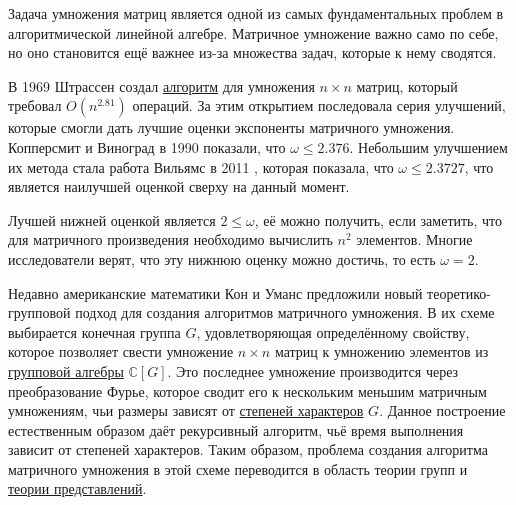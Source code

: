 Задача умножения матриц является одной из самых фундаментальных проблем в алгоритмической линейной алгебре. Матричное умножение важно само по себе, но оно становится ещё важнее из-за множества задач, которые к нему сводятся.
 
В 1969 Штрассен \cite{Strassen:1969} создал \hyperref[Strassen_algorithm]{алгоритм} для умножения $n \times n$ матриц, который требовал $O(n^{2.81})$ операций. За этим открытием последовала серия улучшений, которые смогли дать лучшие оценки экспоненты матричного умножения. Копперсмит и Виноград \cite{Coppersmith:1990} в 1990 показали, что $\omega \leq 2.376$. Небольшим улучшением их метода стала работа Вильямс в 2011 \cite{Williams:2011}, которая показала, что $\omega \leq 2.3727$, что является наилучшей оценкой сверху на данный момент. 

Лучшей нижней оценкой является $2 \leq \omega$, её можно получить, если заметить, что для матричного произведения необходимо вычислить $n^2$ элементов. Многие исследователи верят, что эту нижнюю оценку можно достичь, то есть $\omega = 2$.

Недавно американские математики Кон и Уманс \cite{Cohn03} предложили новый теоретико-групповой подход для создания алгоритмов матричного умножения. В их схеме выбирается конечная группа $G$, удовлетворяющая определённому свойству, которое позволяет свести умножение $n \times n$ матриц к умножению элементов из \hyperref[group_algebra]{групповой алгебры} $\mathbb{C}[G]$. Это последнее умножение производится через преобразование Фурье, которое сводит его к нескольким меньшим матричным умножениям, чьи размеры зависят от \hyperref[def:characters_degree]{степеней характеров} $G$. Данное построение естественным образом даёт рекурсивный алгоритм, чьё время выполнения зависит от степеней характеров. Таким образом, проблема создания алгоритма матричного умножения в этой схеме переводится в область теории групп и \hyperref[representation]{теории представлений}.

